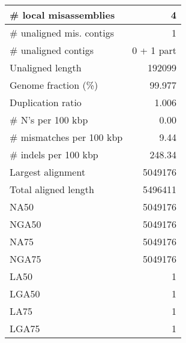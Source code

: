 \documentclass[12pt,a4paper]{article}
\begin{document}
\begin{table}[ht]
\begin{center}
\begin{tabular}{|l*{1}{|r}|}
\# local misassemblies & 4 \\ \hline
\# unaligned mis. contigs & 1 \\ \hline
\# unaligned contigs & 0 + 1 part \\ \hline
Unaligned length & 192099 \\ \hline
Genome fraction (\%) & 99.977 \\ \hline
Duplication ratio & 1.006 \\ \hline
\# N's per 100 kbp & 0.00 \\ \hline
\# mismatches per 100 kbp & 9.44 \\ \hline
\# indels per 100 kbp & 248.34 \\ \hline
Largest alignment & 5049176 \\ \hline
Total aligned length & 5496411 \\ \hline
NA50 & 5049176 \\ \hline
NGA50 & 5049176 \\ \hline
NA75 & 5049176 \\ \hline
NGA75 & 5049176 \\ \hline
LA50 & 1 \\ \hline
LGA50 & 1 \\ \hline
LA75 & 1 \\ \hline
LGA75 & 1 \\ \hline
\end{tabular}
\end{center}
\end{table}
\end{document}
